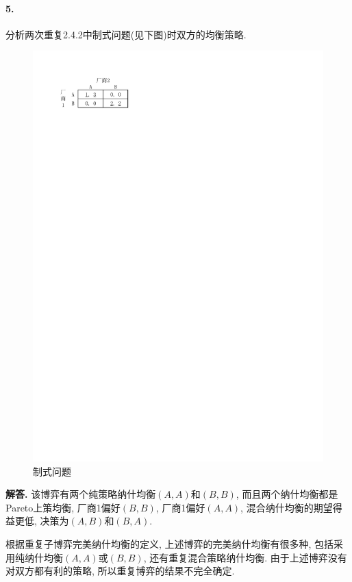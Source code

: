 \documentclass[12pt, a4paper, oneside]{ctexart}
\newenvironment{solution}{\par\noindent\textbf{解答. }}{\bigskip\par}
\begin{document}
\paragraph{5.}分析两次重复2.4.2中制式问题(见下图)时双方的均衡策略.
\begin{figure}[htbp]
    \centering
    \includegraphics[scale=1]{Economic4.5.pdf}
    \caption{制式问题}
\end{figure}
\begin{solution}
    该博弈有两个纯策略纳什均衡$(A,A)$和$(B,B)$, 而且两个纳什均衡都是Pareto上策均衡, 厂商1偏好$(B,B)$, 厂商1偏好$(A,A)$, 混合纳什均衡的期望得益更低, 决策为$(A,B)$和$(B,A)$.

    根据重复子博弈完美纳什均衡的定义, 上述博弈的完美纳什均衡有很多种, 包括采用纯纳什均衡$(A,A)$或$(B,B)$, 还有重复混合策略纳什均衡. 由于上述博弈没有对双方都有利的策略, 所以重复博弈的结果不完全确定.
\end{solution}
\end{document}
